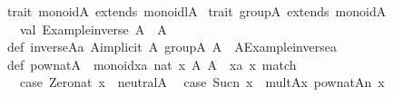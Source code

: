 \begin{isabellebody}
\begin{isamarkuptext}
\isanewline
trait\ monoid{}A{}\ extends\ monoidl{}A{}\ {}\isanewline
{}\isanewline
\isanewline
trait\ group{}A{}\ extends\ monoid{}A{}\ {}\isanewline
\ \ val\ {}Example{}inverse{}{}\ A\ {}{}\ A\isanewline
{}\isanewline
def\ inverse{}A{}{}a{}\ A{}{}implicit\ A{}\ group{}A{}{}{}\ A\ {}\ A{}{}Example{}inverse{}{}a{}\isanewline
\isanewline
def\ pow{}nat{}A\ {}\ monoid{}{}xa{}{}\ nat{}\ x{}\ A{}{}\ A\ {}\ {}xa{}{}\ x{}\ match\ {}\isanewline
\ \ case\ {}Zero{}nat{}\ x{}\ {}{}\ neutral{}A{}\isanewline
\ \ case\ {}Suc{}n{}{}\ x{}\ {}{}\ mult{}A{}{}x{}\ pow{}nat{}A{}{}n{}\ x{}{}\isanewline

\end{isamarkuptext}
\end{isabellebody}

